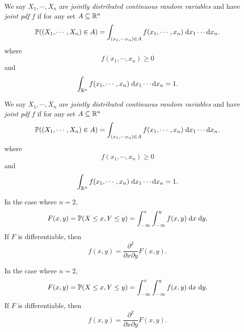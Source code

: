 \begin{note}
  \begin{field}
    \begin{defi}
      We say $X_1, \cdots, X_n$ are \emph{jointly distributed continuous random variables} and have \emph{joint pdf} $f$ if for any set $A\subseteq \mathbb{R}^n$
      \[
        \mathbb{P}((X_1, \cdots, X_n)\in A) = \int_{(x_1, \cdots x_n)\in A} f(x_1, \cdots, x_n)\;\mathrm{d} x_1\cdots \mathrm{d} x_n.
      \]
      where
      \[
        f(x_1, \cdots, x_n) \geq 0
      \]
      and
      \[
        \int_{\mathbb{R}^n} f(x_1, \cdots, x_n)\;\mathrm{d} x_1 \cdots \mathrm{d} x_n = 1.
      \]
    \end{defi}
  \end{field}
  \begin{field}
    \begin{defi}
      We say $X_1, \cdots, X_n$ are \emph{jointly distributed continuous random variables} and have \emph{joint pdf} $f$ if for any set $A\subseteq \mathbb{R}^n$
      \[
        \mathbb{P}((X_1, \cdots, X_n)\in A) = \int_{(x_1, \cdots x_n)\in A} f(x_1, \cdots, x_n)\;\mathrm{d} x_1\cdots \mathrm{d} x_n.
      \]
      where
      \[
        f(x_1, \cdots, x_n) \geq 0
      \]
      and
      \[
        \int_{\mathbb{R}^n} f(x_1, \cdots, x_n)\;\mathrm{d} x_1 \cdots \mathrm{d} x_n = 1.
      \]
    \end{defi}
  \end{field}
  \xplain{}%
\end{note}

\begin{note}
  \begin{field}
    \begin{eg}
      In the case where $n = 2$,
      \[
        F(x, y) = \mathbb{P}(X \leq x,Y \leq y) = \int_{-\infty}^x\int_{-\infty}^y f(x, y)\;\mathrm{d} x\;\mathrm{d} y.
      \]
      If $F$ is differentiable, then
      \[
        f(x, y) = \frac{\partial^2}{\partial x\partial y}F(x, y).
      \]
    \end{eg}
  \end{field}
  \begin{field}
    \begin{eg}
      In the case where $n = 2$,
      \[
        F(x, y) = \mathbb{P}(X \leq x,Y \leq y) = \int_{-\infty}^x\int_{-\infty}^y f(x, y)\;\mathrm{d} x\;\mathrm{d} y.
      \]
      If $F$ is differentiable, then
      \[
        f(x, y) = \frac{\partial^2}{\partial x\partial y}F(x, y).
      \]
    \end{eg}
  \end{field}
  \xplain{}%
\end{note}

